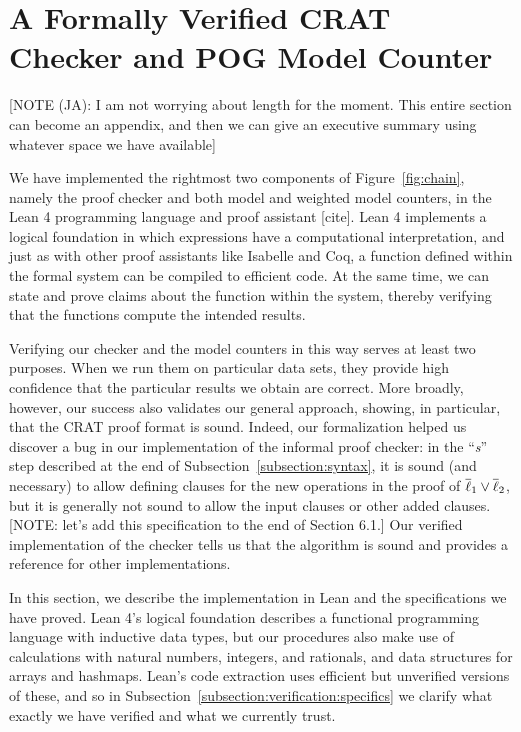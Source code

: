 \section{A Formally Verified CRAT Checker and POG Model Counter}

[NOTE (JA): I am not worrying about length for the moment. This entire section can become an appendix,
and then we can give an executive summary using whatever space
we have available]

We have implemented the rightmost two components of Figure~\ref{fig:chain}, namely the
proof checker and both model and weighted model counters, in the Lean 4 programming language
and proof assistant [cite]. Lean 4 implements a logical foundation in which expressions
have a computational interpretation, and just as with other proof assistants like Isabelle and Coq,
a function defined within the formal system can be compiled to efficient code.
At the same time, we can state and prove claims about the function within the system, thereby
verifying that the functions compute the intended results.

Verifying our checker and the model counters in this way serves at least two purposes.
When we run them on particular data sets, they provide high confidence
that the particular results we obtain are correct.
More broadly, however, our success also validates our general approach,
showing, in particular, that the CRAT proof format is sound.
Indeed, our formalization helped us discover a bug in our implementation
of the informal proof checker: in the ``\emph{s}'' step described at the end of
Subsection~\ref{subsection:syntax}, it is sound (and necessary) to allow defining
clauses for the new operations in the proof of $\overline{\ell}_1 \lor \overline{\ell}_2$,
but it is generally not sound to allow the input clauses or other added clauses.
[NOTE: let's add this specification to the end of Section 6.1.]
Our verified implementation of the checker tells us that the algorithm is sound and
provides a reference for other implementations.

In this section, we describe the implementation in Lean and the specifications we have proved.
Lean 4's logical foundation describes a functional programming language with
inductive data types,
but our procedures also make use of calculations with natural numbers, integers, and rationals,
and data structures for arrays and hashmaps.
Lean's code extraction uses efficient but unverified versions of these,
and so in Subsection~\ref{subsection:verification:specifics} we clarify
what exactly we have verified and what we currently trust.

